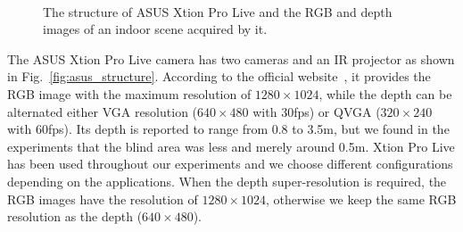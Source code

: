 \begin{figure}[!ht]
\centering
{}\\
\caption{The structure of ASUS Xtion Pro Live and the RGB and depth images of an indoor scene acquired by it.}
\label{fig:asus_illustration}
\end{figure}
The ASUS Xtion Pro Live camera has two cameras and an IR projector as shown in Fig.~\ref{fig:asus_structure}.
According to the official website~\cite{asus}, it provides the RGB image with the maximum resolution of $1280\times1024$, while the depth can be alternated either VGA resolution ($640\times480$ with 30fps) or QVGA ($320\times240$ with 60fps). 
Its depth is reported to range from 0.8 to 3.5m, but we found in the experiments that the blind area was less and merely around 0.5m.  
Xtion Pro Live has been used throughout our experiments and we choose different configurations depending on the applications.
When the depth super-resolution is required, the RGB images have the resolution of $1280\times1024$, otherwise we keep the same RGB resolution as the depth ($640\times480$).

